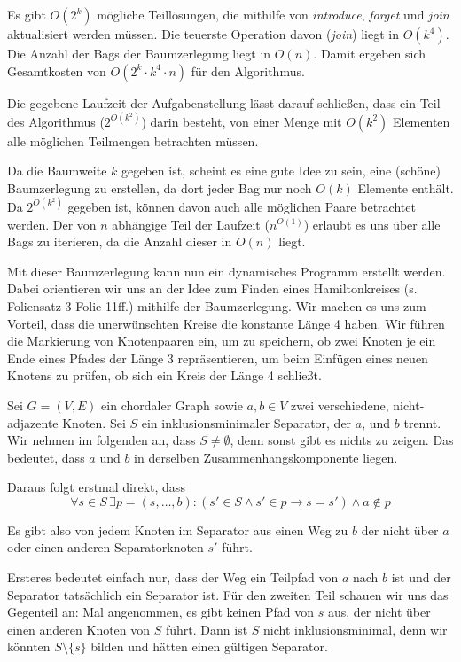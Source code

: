 Es gibt $O(2^k)$ mögliche Teillösungen, die mithilfe von \textit{introduce}, \textit{forget} und \textit{join} aktualisiert werden müssen. Die teuerste Operation davon (\textit{join}) liegt in $O(k^4)$. Die Anzahl der Bags der Baumzerlegung liegt in $O(n)$. Damit ergeben sich Gesamtkosten von $O(2^k\cdot k^4\cdot n)$ für den Algorithmus.

\how

Die gegebene Laufzeit der Aufgabenstellung lässt darauf schließen, dass ein Teil des Algorithmus ($2^{O(k^2)}$) darin besteht, von einer Menge mit $O(k^2)$ Elementen alle möglichen Teilmengen betrachten müssen.

Da die Baumweite $k$ gegeben ist, scheint es eine gute Idee zu sein, eine (schöne) Baumzerlegung zu erstellen, da dort jeder Bag nur noch $O(k)$ Elemente enthält. Da $2^{O(k^2)}$ gegeben ist, können davon auch alle möglichen Paare betrachtet werden. Der von $n$ abhängige Teil der Laufzeit ($n^{O(1)}$) erlaubt es uns über alle Bags zu iterieren, da die Anzahl dieser in $O(n)$ liegt.

Mit dieser Baumzerlegung kann nun ein dynamisches Programm erstellt werden. Dabei orientieren wir uns an der Idee zum Finden eines Hamiltonkreises (s. Foliensatz 3 Folie 11ff.) mithilfe der Baumzerlegung. Wir machen es uns zum Vorteil, dass die unerwünschten Kreise die konstante Länge 4 haben. Wir führen die Markierung von Knotenpaaren ein, um zu speichern, ob zwei Knoten je ein Ende eines Pfades der Länge 3 repräsentieren, um beim Einfügen eines neuen Knotens zu prüfen, ob sich ein Kreis der Länge 4 schließt.


\subexercise
\label{sec:sep-clique}

Sei $G = (V,E)$ ein chordaler Graph sowie $a,b \in V$ zwei verschiedene, nicht-adjazente Knoten. Sei $S$ ein inklusionsminimaler Separator, der $a$, und $b$ trennt.
Wir nehmen im folgenden an, dass $S \neq \emptyset$, denn sonst gibt es nichts zu zeigen. Das bedeutet, dass $a$ und $b$ in derselben Zusammenhangskomponente liegen.

Daraus folgt erstmal direkt, dass $$\forall s \in S \, \exists p = (s, \dots, b) \colon (s' \in S \wedge s' \in p \rightarrow s = s') \wedge a \notin p$$

Es gibt also von jedem Knoten im Separator aus einen Weg zu $b$ der nicht über $a$ oder einen anderen Separatorknoten $s'$ führt.

Ersteres bedeutet einfach nur, dass der Weg ein Teilpfad von $a$ nach $b$ ist und der Separator tatsächlich ein Separator ist. Für den zweiten Teil schauen wir uns das Gegenteil an:
Mal angenommen, es gibt keinen Pfad von $s$ aus, der nicht über einen anderen Knoten von $S$ führt. Dann ist $S$ nicht inklusionsminimal, denn wir könnten $S \setminus \{s\}$ bilden und hätten einen gültigen Separator.

